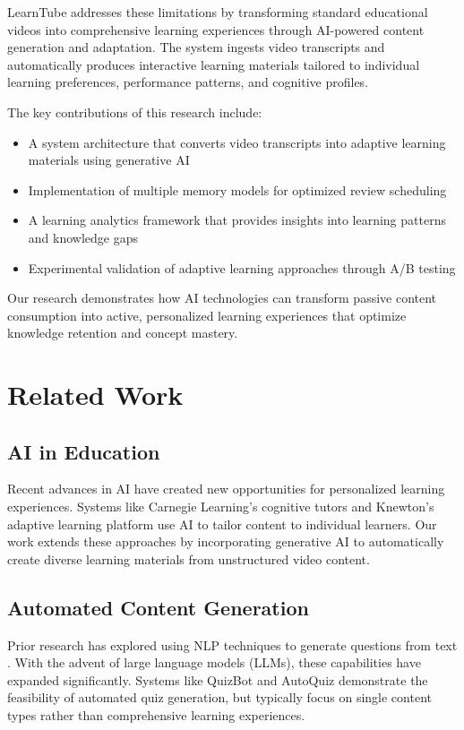 \documentclass[conference]{IEEEtran}
\begin{document}
LearnTube addresses these limitations by transforming standard educational videos into comprehensive learning experiences through AI-powered content generation and adaptation. The system ingests video transcripts and automatically produces interactive learning materials tailored to individual learning preferences, performance patterns, and cognitive profiles.

The key contributions of this research include:
\begin{itemize}
    \item A system architecture that converts video transcripts into adaptive learning materials using generative AI
    \item Implementation of multiple memory models for optimized review scheduling
    \item A learning analytics framework that provides insights into learning patterns and knowledge gaps
    \item Experimental validation of adaptive learning approaches through A/B testing
\end{itemize}

Our research demonstrates how AI technologies can transform passive content consumption into active, personalized learning experiences that optimize knowledge retention and concept mastery.

\section{Related Work}
\subsection{AI in Education}
Recent advances in AI have created new opportunities for personalized learning experiences. Systems like Carnegie Learning's cognitive tutors \cite{r2} and Knewton's adaptive learning platform \cite{r3} use AI to tailor content to individual learners. Our work extends these approaches by incorporating generative AI to automatically create diverse learning materials from unstructured video content.

\subsection{Automated Content Generation}
Prior research has explored using NLP techniques to generate questions from text \cite{r4}. With the advent of large language models (LLMs), these capabilities have expanded significantly. Systems like QuizBot \cite{r5} and AutoQuiz \cite{r6} demonstrate the feasibility of automated quiz generation, but typically focus on single content types rather than comprehensive learning experiences.
\end{document}
